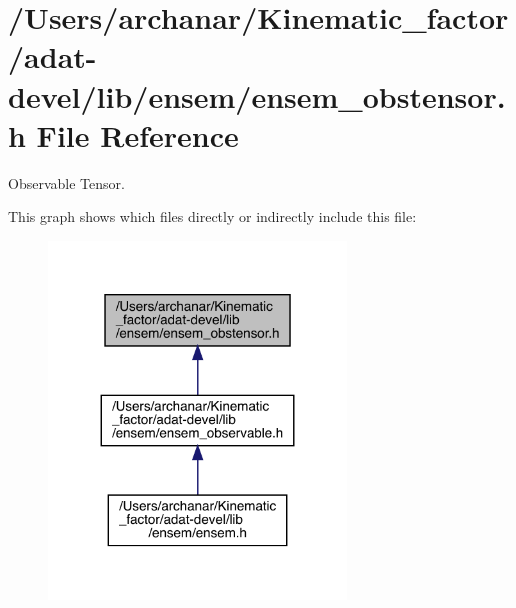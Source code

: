 \hypertarget{adat-devel_2lib_2ensem_2ensem__obstensor_8h}{}\section{/\+Users/archanar/\+Kinematic\+\_\+factor/adat-\/devel/lib/ensem/ensem\+\_\+obstensor.h File Reference}
\label{adat-devel_2lib_2ensem_2ensem__obstensor_8h}


Observable Tensor.  


This graph shows which files directly or indirectly include this file\+:
\nopagebreak
\begin{figure}[H]
\begin{center}
\leavevmode
\includegraphics[width=224pt]{d7/d76/adat-devel_2lib_2ensem_2ensem__obstensor_8h__dep__incl}
\end{center}
\end{figure}

